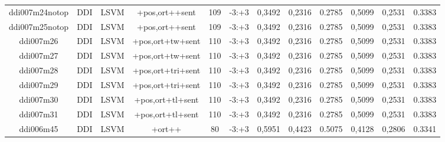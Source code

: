 \documentclass[a4paper]{article}
\begin{document}
\begin{landscape}
\begin{center}
\begin{tabular}{ |c|c|c|c|c|c|c|c|c|c|c|c|}
 	
 
 	
 		
 		\small{ ddi007m24notop } & DDI & LSVM & +pos,ort++sent  &  109 &  -3:+3  &  0,3492 & 0,2316 & 0.2785  &  0,5099 & 0,2531 & 0.3383 \\
 		

 	
 
 	
 		
 		\small{ ddi007m25notop } & DDI & LSVM & +pos,ort++sent  &  109 &  -3:+3  &  0,3492 & 0,2316 & 0.2785  &  0,5099 & 0,2531 & 0.3383 \\
 		

 	
 
 	
 		
 		\small{ ddi007m26 } & DDI & LSVM & +pos,ort+tw+sent  &  110 &  -3:+3  &  0,3492 & 0,2316 & 0.2785  &  0,5099 & 0,2531 & 0.3383 \\
 		

 	
 
 	
 		
 		\small{ ddi007m27 } & DDI & LSVM & +pos,ort+tw+sent  &  110 &  -3:+3  &  0,3492 & 0,2316 & 0.2785  &  0,5099 & 0,2531 & 0.3383 \\
 		

 	
 
 	
 		
 		\small{ ddi007m28 } & DDI & LSVM & +pos,ort+tri+sent  &  110 &  -3:+3  &  0,3492 & 0,2316 & 0.2785  &  0,5099 & 0,2531 & 0.3383 \\
 		

 	
 
 	
 		
 		\small{ ddi007m29 } & DDI & LSVM & +pos,ort+tri+sent  &  110 &  -3:+3  &  0,3492 & 0,2316 & 0.2785  &  0,5099 & 0,2531 & 0.3383 \\
 		

 	
 
 	
 		
 		\small{ ddi007m30 } & DDI & LSVM & +pos,ort+tl+sent  &  110 &  -3:+3  &  0,3492 & 0,2316 & 0.2785  &  0,5099 & 0,2531 & 0.3383 \\
 		

 	
 
 	
 		
 		\small{ ddi007m31 } & DDI & LSVM & +pos,ort+tl+sent  &  110 &  -3:+3  &  0,3492 & 0,2316 & 0.2785  &  0,5099 & 0,2531 & 0.3383 \\
 		

 	
 
 	
 		
 		\small{ ddi006m45 } & DDI & LSVM & +ort++  &  80 &  -3:+3  &  0,5951 & 0,4423 & 0.5075  &  0,4128 & 0,2806 & 0.3341 \\
 		


\end{tabular}
\end{center}
\end{landscape}
\end{document}
